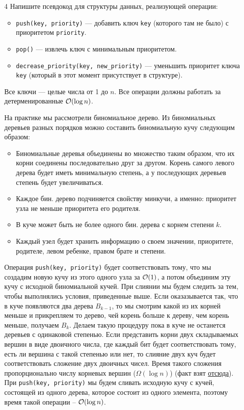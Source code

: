 \begin{enumerate}
  \item[4]
    Напишите псевдокод для структуры данных, реализующей операции:
    \begin{itemize}
      \item \texttt{push(key, priority)} --- добавить ключ \texttt{key} (которого там не было) с приоритетом \texttt{priority}.
      \item \texttt{pop()} --- извлечь ключ с минимальным приоритетом.
      \item \texttt{decrease\_priority(key, new\_priority)} --- уменьшить приоритет ключа \texttt{key} (который в этот момент присутствует в структуре).
    \end{itemize}
    Все ключи --- целые числа от 1 до $n$. Все операции должны работать за детерменированные $\mathcal{O}(\log{n})$.
    \begin{solution}
      На практике мы рассмотрели биномиальное дерево. Из биномиальных деревьев разных порядков можно составить биномиальную кучу следующим образом:
      \begin{itemize}
        \item Биномиальные деревья объединены во множество таким образом, что их корни соединены последовательно друг за другом. Корень самого левого дерева будет иметь минимальную степень, а у последующих деревьев степень будет увеличиваться. 
        \item Каждое бин. дерево подчиняется свойству минкучи, а именно: приоритет узла не меньше приоритета его родителя.
        \item В куче может быть не более одного бин. дерева с корнем степени $k$.
        \item Каждый узел будет хранить информацию о своем значении, приоритете, родителе, левом ребенке, правом брате и степени.
      \end{itemize}

      Операция \texttt{push(key, priority)} будет соответствовать тому, что мы создадим новую кучу из этого одного узла за $\mathcal{O}(1)$, а потом объединим эту кучу с исходной биномиальной кучей. При слиянии мы будем следить за тем, чтобы выполнялись условия, приведенные выше. Если оказазывается так, что в куче появляются два дерева $B_{k-1}$, то мы смотрим какой из их корней меньше и прикрепляем то дерево, чей корень больше к дереву, чем корень меньше, получаем $B_{k}$. Делаем такую процедуру пока в куче не останется деревьев с одинаковой степенью. Если представить корни двух складываемых вершин в виде двоичного числа, где каждый бит будет соответствовать тому, есть ли вершина с такой степенью или нет, то слияние двух куч будет соответствовать сложение двух двоичных чисел. Время такого сложения пропорционально числу корневых вершин ($\Omega(\log{n})$) (факт взят \href{https://neerc.ifmo.ru/wiki/index.php?title=%D0%91%D0%B8%D0%BD%D0%BE%D0%BC%D0%B8%D0%B0%D0%BB%D1%8C%D0%BD%D0%B0%D1%8F_%D0%BA%D1%83%D1%87%D0%B0#merge}{отсюда}). При \texttt{push(key, priority)} мы будем сливать исходную кучу с кучей, состоящей из одного дерева, которое состоит из одного элемента, поэтому время такой операции -- $\mathcal{O}(\log{n})$.


\end{solution}
\end{enumerate}
